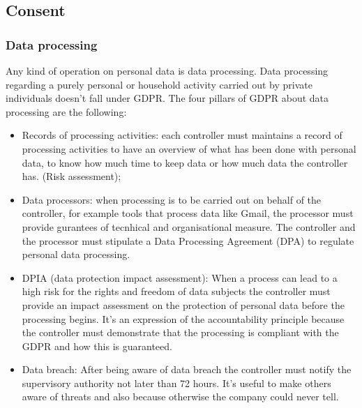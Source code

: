 \subsection{Consent}
\subsubsection{Data processing}
Any kind of operation on personal data is data processing. Data processing regarding a purely personal or household activity carried out by private individuals doesn't fall under GDPR. The four pillars of GDPR about data processing are the following:
\begin{itemize}
    \item Records of processing activities: each controller must maintains a record of processing activities to have an overview of what has been done with personal data, to know how much time to keep data or how much data the controller has. (Risk assessment);
    \item Data processors: when processing is to be carried out on behalf of the controller, for example tools that process data like Gmail, the processor must provide gurantees of tecnhical and organisational measure. The controller and the processor must stipulate a Data Processing Agreement (DPA) to regulate personal data processing.
    \item DPIA (data protection impact assessment): When a process can lead to a high risk for the rights and freedom of data subjects the controller must provide an impact assessment on the protection of personal data before the processing begins. It's an expression of the accountability principle because the controller must demonstrate that the processing is compliant with the GDPR and how this is guaranteed.
    \item Data breach: After being aware of data breach the controller must notify the supervisory authority not later than 72 hours. It's useful to make others aware of threats and also because otherwise the company could never tell.
\end{itemize}
